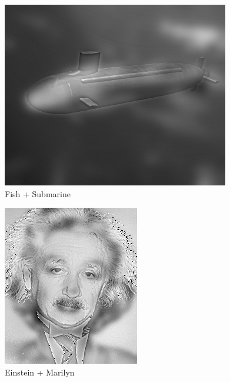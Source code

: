\documentclass{article}
\begin{document}
\begin{minipage}{\linewidth}
    \centering
    \begin{minipage}{0.45\linewidth}
        \begin{figure}[H]
			\includegraphics[width=\linewidth]{Ejercicio3/hybrid1.png}          
			\caption{Fish + Submarine}
        \end{figure}
    \end{minipage}
    \hspace{0.05\linewidth}
    \begin{minipage}{0.45\linewidth}
        \begin{figure}[H]
			\includegraphics[width=\linewidth]{Ejercicio3/hybrid2.png}          
			\caption{Einstein + Marilyn}
		\end{figure}
    \end{minipage}
    

\end{minipage}
\end{document}

